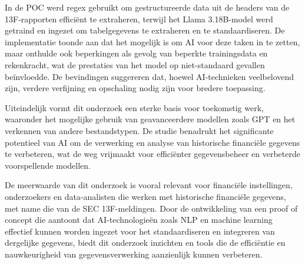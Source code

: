 In de POC werd regex gebruikt om gestructureerde data uit de headers van de 13F-rapporten efficiënt te extraheren, terwijl het Llama 3.18B-model werd getraind en ingezet om tabelgegevens te extraheren en te standaardiseren. De implementatie toonde aan dat het mogelijk is om AI voor deze taken in te zetten, maar onthulde ook beperkingen als gevolg van beperkte trainingsdata en rekenkracht, wat de prestaties van het model op niet-standaard gevallen beïnvloedde. De bevindingen suggereren dat, hoewel AI-technieken veelbelovend zijn, verdere verfijning en opschaling nodig zijn voor bredere toepassing.

Uiteindelijk vormt dit onderzoek een sterke basis voor toekomstig werk, waaronder het mogelijke gebruik van geavanceerdere modellen zoals GPT en het verkennen van andere bestandstypen. De studie benadrukt het significante potentieel van AI om de verwerking en analyse van historische financiële gegevens te verbeteren, wat de weg vrijmaakt voor efficiënter gegevensbeheer en verbeterde voorspellende modellen.

De meerwaarde van dit onderzoek is vooral relevant voor financiële instellingen, onderzoekers en data-analisten die werken met historische financiële gegevens, met name die van de SEC 13F-meldingen. Door de ontwikkeling van een proof of concept die aantoont dat AI-technologieën zoals NLP en machine learning effectief kunnen worden ingezet voor het standaardiseren en integreren van dergelijke gegevens, biedt dit onderzoek inzichten en tools die de efficiëntie en nauwkeurigheid van gegevensverwerking aanzienlijk kunnen verbeteren.